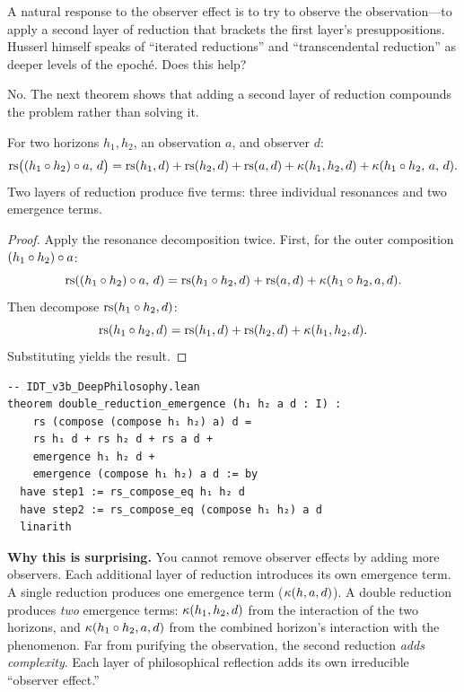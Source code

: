 A natural response to the observer effect is to try to observe the
observation---to apply a second layer of reduction that brackets the
first layer's presuppositions. Husserl himself speaks of ``iterated
reductions'' and ``transcendental reduction'' as deeper levels of the
epoch\'e. Does this help?

No. The next theorem shows that adding a second layer of reduction
compounds the problem rather than solving it.

\begin{theorem}
\label{thm:double-reduction}
For two horizons $h_1, h_2$, an observation $a$, and observer $d$:
\[
\mathrm{rs}\bigl((h_1 \circ h_2) \circ a,\, d\bigr) =
\mathrm{rs}(h_1, d) + \mathrm{rs}(h_2, d) + \mathrm{rs}(a, d) +
\kappa(h_1, h_2, d) + \kappa(h_1 \circ h_2,\, a,\, d).
\]
Two layers of reduction produce five terms: three individual resonances
and two emergence terms.
\end{theorem}

\begin{proof}
Apply the resonance decomposition twice. First, for the outer
composition $(h_1 \circ h_2) \circ a$:
\[
\mathrm{rs}((h_1 \circ h_2) \circ a,\, d) =
\mathrm{rs}(h_1 \circ h_2, d) + \mathrm{rs}(a, d) +
\kappa(h_1 \circ h_2, a, d).
\]
Then decompose $\mathrm{rs}(h_1 \circ h_2, d)$:
\[
\mathrm{rs}(h_1 \circ h_2, d) = \mathrm{rs}(h_1, d) + \mathrm{rs}(h_2, d) +
\kappa(h_1, h_2, d).
\]
Substituting yields the result.
\end{proof}

\begin{lstlisting}
-- IDT_v3b_DeepPhilosophy.lean
theorem double_reduction_emergence (h₁ h₂ a d : I) :
    rs (compose (compose h₁ h₂) a) d =
    rs h₁ d + rs h₂ d + rs a d +
    emergence h₁ h₂ d +
    emergence (compose h₁ h₂) a d := by
  have step1 := rs_compose_eq h₁ h₂ d
  have step2 := rs_compose_eq (compose h₁ h₂) a d
  linarith
\end{lstlisting}

\begin{surprisebox}
\textbf{Why this is surprising.} You cannot remove observer effects by
adding more observers. Each additional layer of reduction introduces
its own emergence term. A single reduction produces one emergence term
($\kappa(h, a, d)$). A double reduction produces \emph{two} emergence
terms: $\kappa(h_1, h_2, d)$ from the interaction of the two horizons,
and $\kappa(h_1 \circ h_2, a, d)$ from the combined horizon's
interaction with the phenomenon. Far from purifying the observation,
the second reduction \emph{adds complexity}. Each layer of philosophical
reflection adds its own irreducible ``observer effect.''
\end{surprisebox}

